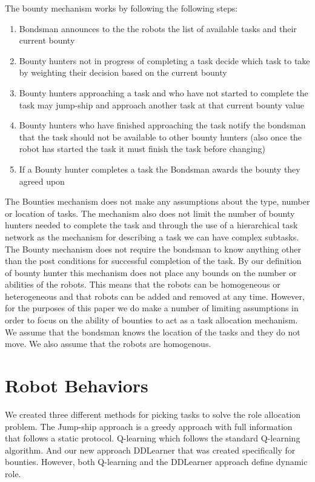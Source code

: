 \documentclass[twocolumn]{article}
\begin{document}
The bounty mechanism works by following the following steps:

\begin{enumerate}
\item Bondsman announces to the the robots the list of available tasks and their current bounty
\item Bounty hunters not in progress of completing a task decide which task to take by weighting their decision based on the current bounty
\item Bounty hunters approaching a task and who have not started to complete the task may jump-ship and approach another task at that current bounty value
\item Bounty hunters who have finished approaching the task notify the bondsman that the task should not be available to other bounty hunters (also once the robot has started the task it must finish the task before changing) %
\item If a Bounty hunter completes a task the Bondsman awards the bounty they agreed upon
\end{enumerate}

The Bounties mechanism does not make any assumptions about the type, number or location of tasks.  The mechanism also does not limit the number of bounty hunters needed to complete the task and through the use of a hierarchical task network as the mechanism for describing a task we can have complex subtasks.  The Bounty mechanism does not require the bondsman to know anything other than the post conditions for successful completion of the task.  By our definition of bounty hunter this mechanism does not place any bounds on the number or abilities of the robots.  This means that the robots can be homogeneous or heterogeneous and that robots can be added and removed at any time.
However, for the purposes of this paper we do make a number of limiting assumptions in order to focus on the ability of bounties to act as a task allocation mechanism.  We assume that the bondsman knows the location of the tasks and they do not move.  We also assume that the robots are homogenous.

\section{Robot Behaviors}
We created three different methods for picking tasks to solve the role allocation problem.  The Jump-ship approach is a greedy approach with full information that follows a static protocol.  Q-learning which follows the standard Q-learning algorithm.  And our new approach DDLearner that was created specifically for bounties.  However, both Q-learning and the DDLearner approach define dynamic role.  
\end{document}
